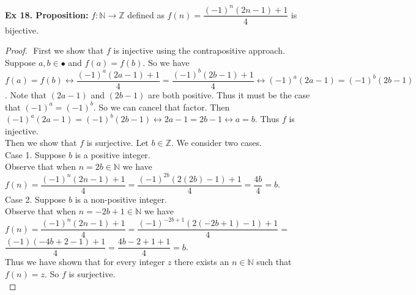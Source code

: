 \documentclass{article}
\begin{document}
\noindent \textbf{Ex 18. Proposition:} $f: \mathbb{N} \rightarrow \mathbb{Z}$ defined as $f(n)=\dfrac{(-1)^n(2n-1)+1}{4}$ is bijective.
\begin{proof}
$ $\newline
First we show that $f$ is injective using the contrapositive approach. Suppose $a, b \in \mathbb{•}$ and $f(a)=f(b)$. So we have $f(a)=f(b) \leftrightarrow \dfrac{(-1)^a(2a-1)+1}{4} = \dfrac{(-1)^b(2b-1)+1}{4} \leftrightarrow (-1)^a(2a-1)=(-1)^b(2b-1)$. Note that $(2a-1)$ and $(2b-1)$ are both positive. Thus it must be the case that $(-1)^a=(-1)^b$. So we can cancel that factor. Then $(-1)^a(2a-1)=(-1)^b(2b-1)\leftrightarrow 2a-1=2b-1 \leftrightarrow a=b$. Thus $f$ is injective.\\

\noindent Then we show that $f$ is surjective. Let $b \in \mathbb{Z}$. We consider two cases.\\

\noindent Case 1. Suppose $b$ is a positive integer.\\
\indent Observe that when $n=2b \in \mathbb{N}$ we have $f(n)=\dfrac{(-1)^n(2n-1)+1}{4}=\dfrac{(-1)^{2b}(2(2b)-1)+1}{4}=\dfrac{4b}{4}=b$.\\

\noindent Case 2. Suppose $b$ is a non-positive integer.\\
\indent Observe that when $n=-2b+1 \in \mathbb{N}$ we have $f(n)=\dfrac{(-1)^n(2n-1)+1}{4}=\dfrac{(-1)^{-2b+1}(2(-2b+1)-1)+1}{4}=$\\
\indent $\dfrac{(-1)(-4b+2-1)+1}{4}= \dfrac{4b-2+1+1}{4} = b$.\\

\noindent Thus we have shown that for every integer $z$ there exists an $n \in \mathbb{N}$ such that $f(n)=z$. So $f$ is surjective.\\


\end{proof}
\end{document}

